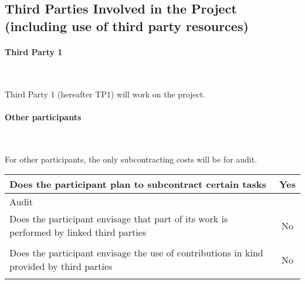 \documentclass[noworkareas,deliverables,\classoptions]{euproposal}       %
\begin{document}
\begin{proposal}







\subsection{Third Parties Involved in the Project (including use of third party resources)}
\label{section:ThirdParties}

\paragraph{Third Party 1}\ 


Third Party 1 (hereafter TP1) will work on the project.

\paragraph{Other participants}\ 

For other participants, the only subcontracting costs will be for audit.

\bgroup
\def\arraystretch{1.5}  %
\noindent \begin{tabular}{|p{}|c|}
\hline
Does the participant plan to subcontract certain
tasks & Yes \\
\hline
\multicolumn{2}{|l|}{Audit} \\
\hline
Does the participant envisage that part of its work
is performed by linked third parties & No \\
\hline
\multicolumn{2}{|l|}{} \\
\hline
Does the participant envisage the use of
contributions in kind provided by
third parties & No \\
\hline
\multicolumn{2}{|l|}{} \\
\hline
\end{tabular}
\egroup



\newpage


\end{proposal}
\end{document}
